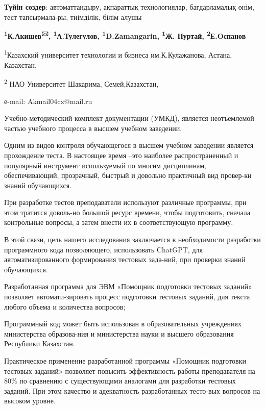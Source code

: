 {\bfseries Түйін сөздер}: автоматтандыру, ақпараттық технологиялар,
бағдарламалық өнім, тест тапсырмала-ры, тиімділік, білім алушы



\begin{center}

{\bfseries \textsuperscript{1}К.Акишев\textsuperscript{🖂},
\textsuperscript{1}А.Тулегулов, \textsuperscript{1}D.Zamangarin,
\textsuperscript{1}Ж. Нуртай, \textsuperscript{2}Е.Oспанов}

\textsuperscript{1}Казахский университет технологии и бизнеса
им.К.Кулажанова, Астана, Казахстан,

\textsuperscript{2} НАО Университет Шакарима, Семей,Казахстан,

е-mail: Akmail04cx@mail.ru
\end{center}

Учебно-методический комплект документации (УМКД), является неотъемлемой
частью учебного процесса в высшем учебном заведении.

Одним из видов контроля обучающегося в высшем учебном заведении является
прохождение теста. В настоящее время --это наиболее распространенный и
популярный инструмент используемый по многим дисциплинам,
обеспечивающий, прозрачный, быстрый и довольно практичный вид провер-ки
знаний обучающихся.

При разработке тестов преподаватели используют различные программы, при
этом тратится доволь-но большой ресурс времени, чтобы подготовить,
сначала контрольные вопросы, а затем внести их в соответствующую
программу.

В этой связи, цель нашего исследования заключается в необходимости
разработки программного кода позволяющего, использовать ChatGPT, для
автоматизированного формирования тестовых зада-ний, при проверки знаний
обучающихся.

Разработанная программа для ЭВМ «Помощник подготовки тестовых заданий»
позволяет автомати-зировать процесс подготовки тестовых заданий, для
текста любого объема и количества вопросов;

Программный код может быть использован в образовательных учреждениях
министерства образова-ния и министерства науки и высшего образования
Республики Казахстан.

Практическое применение разработанной программы «Помощник подготовки
тестовых заданий» позволяет повысить эффективность работы преподавателя
на 80\% по сравнению с существующими аналогами для разработки тестовых
заданий. При этом качество и адекватность разработанных тесто-вых
вопросов на высоком уровне.

